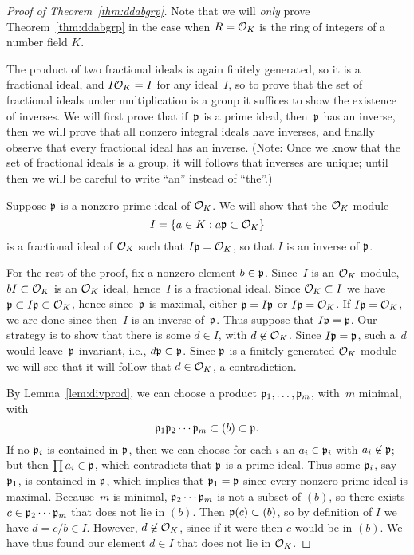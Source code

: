 \begin{proof}[Proof of Theorem~\ref{thm:ddabgrp}]
  Note that we will {\em only} prove Theorem~\ref{thm:ddabgrp} in the
  case when $R=\mathcal{O}_K$ is the ring of integers of a number field $K$.

  The product of two fractional ideals is again finitely generated, so
  it is a fractional ideal, and $I\mathcal{O}_K=I$ for any ideal~$I$,
  so to prove that the set of fractional ideals under multiplication is
  a group it suffices to show the existence of inverses.  We will first
  prove that if~$\mathfrak{p}$ is a prime ideal, then~$\mathfrak{p}$ has an inverse, then we
  will prove that all nonzero integral ideals have inverses, and finally
  observe that every fractional ideal has an inverse.  (Note: Once we
  know that the set of fractional ideals is a group, it will follows
  that inverses are unique; until then we will be careful to write
  ``an'' instead of ``the''.)

  Suppose $\mathfrak{p}$ is a nonzero prime ideal of $\mathcal{O}_K$.   We will show that
  the $\mathcal{O}_K$-module
  $$
    I = \{a \in K : a\mathfrak{p} \subset \mathcal{O}_K \}
  $$
  is a fractional ideal of $\mathcal{O}_K$ such that $I\mathfrak{p} = \mathcal{O}_K$, so that
  $I$ is an inverse of $\mathfrak{p}$.

  For the rest of the proof, fix a nonzero element $b\in \mathfrak{p}$.  Since~$I$
  is an $\mathcal{O}_K$-module, $bI\subset \mathcal{O}_K$ is an $\mathcal{O}_K$ ideal, hence~$I$ is
  a fractional ideal.  Since $\mathcal{O}_K \subset I$ we have $\mathfrak{p} \subset I \mathfrak{p}
  \subset \mathcal{O}_K$, hence since~$\mathfrak{p}$ is maximal, either $\mathfrak{p} = I\mathfrak{p}$ or $I\mathfrak{p}
  = \mathcal{O}_K$.  If $I\mathfrak{p}=\mathcal{O}_K$, we are done since then~$I$ is an inverse
  of~$\mathfrak{p}$.  Thus suppose that $I\mathfrak{p}=\mathfrak{p}$.  Our strategy is to show that
  there is some $d\in I$, with $d\not\in\mathcal{O}_K$.  Since $I\mathfrak{p}=\mathfrak{p}$, such
  a~$d$ would leave~$\mathfrak{p}$ invariant, i.e., $d \mathfrak{p} \subset \mathfrak{p}$.  Since $\mathfrak{p}$
  is a finitely generated $\mathcal{O}_K$-module we will see that
  it will follow that $d\in \mathcal{O}_K$, a contradiction.

  By Lemma~\ref{lem:divprod}, we can choose a product $\mathfrak{p}_1,\dots, \mathfrak{p}_m$,
  with~$m$ minimal, with
  $$
    \mathfrak{p}_1\mathfrak{p}_2\cdots \mathfrak{p}_m \subset (b) \subset \mathfrak{p}.
  $$ If no $\mathfrak{p}_i$ is contained in $\mathfrak{p}$, then we can choose for each $i$
  an $a_i \in \mathfrak{p}_i$ with $a_i\not\in \mathfrak{p}$; but then $\prod a_i\in \mathfrak{p}$,
  which contradicts that $\mathfrak{p}$ is a prime ideal.  Thus some $\mathfrak{p}_i$, say
  $\mathfrak{p}_1$, is contained in $\mathfrak{p}$, which implies that $\mathfrak{p}_1 = \mathfrak{p}$ since
  every nonzero prime ideal is maximal.  Because~$m$ is minimal,
  $\mathfrak{p}_2\cdots \mathfrak{p}_m$ is not a subset of $(b)$, so there exists $c\in
  \mathfrak{p}_2\cdots \mathfrak{p}_m$ that does not lie in $(b)$. Then $\mathfrak{p}(c) \subset (b)$,
  so by definition of $I$ we have $d=c/b\in I$.  However, $d\not\in
  \mathcal{O}_K$, since if it were then $c$ would be in $(b)$.  We have thus
  found our element $d\in I$ that does not lie in $\mathcal{O}_K$.


\end{proof}
